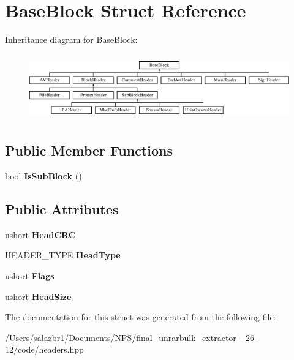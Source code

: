 \hypertarget{struct_base_block}{\section{Base\-Block Struct Reference}
\label{struct_base_block}
}
Inheritance diagram for Base\-Block\-:\begin{figure}[H]
\begin{center}
\leavevmode
\includegraphics[height=2.871795cm]{struct_base_block}
\end{center}
\end{figure}
\subsection*{Public Member Functions}
\begin{DoxyCompactItemize}
\item 
\hypertarget{struct_base_block_a9eaebe3621abca92a6f9369dd7fb3c15}{bool {\bfseries Is\-Sub\-Block} ()}\label{struct_base_block_a9eaebe3621abca92a6f9369dd7fb3c15}

\end{DoxyCompactItemize}
\subsection*{Public Attributes}
\begin{DoxyCompactItemize}
\item 
\hypertarget{struct_base_block_a3f9faebc338b925dff7251eaa12b6125}{ushort {\bfseries Head\-C\-R\-C}}\label{struct_base_block_a3f9faebc338b925dff7251eaa12b6125}

\item 
\hypertarget{struct_base_block_a4ca02caaefa3e091567787dfe370cc00}{H\-E\-A\-D\-E\-R\-\_\-\-T\-Y\-P\-E {\bfseries Head\-Type}}\label{struct_base_block_a4ca02caaefa3e091567787dfe370cc00}

\item 
\hypertarget{struct_base_block_a99236589d620b6635717cf5800687253}{ushort {\bfseries Flags}}\label{struct_base_block_a99236589d620b6635717cf5800687253}

\item 
\hypertarget{struct_base_block_a2de5de50cce54eab3b72e8ff7bef15bd}{ushort {\bfseries Head\-Size}}\label{struct_base_block_a2de5de50cce54eab3b72e8ff7bef15bd}

\end{DoxyCompactItemize}


The documentation for this struct was generated from the following file\-:\begin{DoxyCompactItemize}
\item 
/\-Users/salazbr1/\-Documents/\-N\-P\-S/final\-\_\-unrarbulk\-\_\-extractor\-\_-\/26-\/12/code/headers.\-hpp\end{DoxyCompactItemize}
